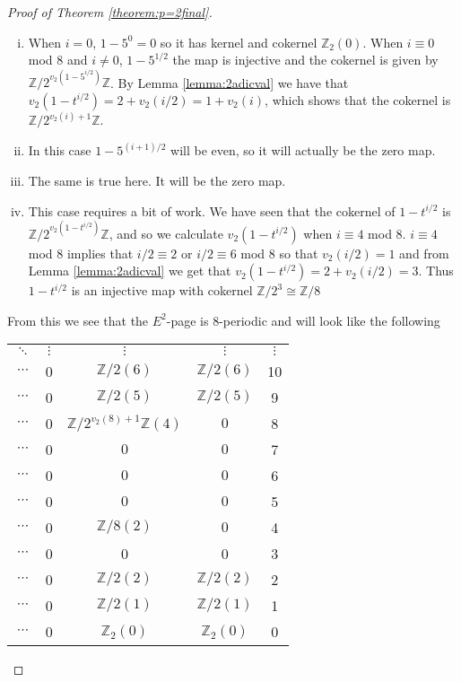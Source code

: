 \documentclass[a4paper]{article} %
\theoremstyle{definition}
\newcommand{\Z}{\mathbb{Z}}
\begin{document}
\begin{proof}[Proof of Theorem \ref{theorem:p=2final}]
  \begin{enumerate}[i)]
    \item When $i=0$, $1-5^0 = 0$ so it has kernel and cokernel $\Z_2(0)$. When $i \equiv 0$ mod $8$ and $i \neq 0$, $1-5^{1/2}$ the map is injective and the cokernel is given by $\Z/2^{v_2(1-5^{i/2})}\Z$. By Lemma \ref{lemma:2adicval} we have that $v_2(1-t^{i/2}) = 2 + v_2(i/2) = 1 + v_2(i)$,
    which shows that the cokernel is $\Z/2^{v_2(i)+1}\Z$.
    \item In this case $1-5^{(i+1)/2}$ will be even, so it will actually be the zero map.
    \item The same is true here. It will be the zero map.
    \item This case requires a bit of work. We have seen that the cokernel of $1-t^{i/2}$ is $\Z/2^{v_2(1-t^{i/2})}\Z$, and so we calculate $v_2({1-t^{i/2}})$ when $i \equiv 4$ mod $8$. $i \equiv 4$ mod $8$ implies that $i/2 \equiv 2$ or $i/2 \equiv 6$ mod $8$ so that $v_2(i/2) = 1$
    and from Lemma \ref{lemma:2adicval} we get that $v_2(1-t^{i/2}) = 2 + v_2(i/2) = 3$. Thus $1-t^{i/2}$ is an injective map with cokernel $\Z/2^3 \cong \Z/8$
  \end{enumerate}
  From this we see that the $E^2$-page is $8$-periodic and will look like the following
  \begin{table}[H]
    \centering
    \setlength{\tabcolsep}{12pt}
    \setlength{\extrarowheight}{2pt}
  \begin{tabular}{cccc|c}
    $\ddots$        &   $\vdots$ &  $\vdots$  & $\vdots$  & $\vdots$ \\
    $\cdots$        &   0 &  $\Z/2(6)$  & $\Z/2(6)$  & 10 \\
    $\cdots$        &   0 &  $\Z/2(5)$  & $\Z/2(5)$  & 9 \\
    $\cdots$        &   0 &  $\Z/2^{v_2(8)+1}\Z(4)$  & $0$  & 8 \\
    $\cdots$        &   0 &  $0$  & $0$  & 7 \\
    $\cdots$        &   0 &  $0$  & $0$  & 6 \\
    $\cdots$        &   0 &  $0$  & $0$  & 5 \\
      $\cdots$        &   0 &  $\Z/8 (2)$  & $0$  & 4 \\
      $\cdots$        &   0 &  0  &  0 & 3 \\
      $\cdots$        &  0  &  $\Z/2(2)$  &  $\Z/2(2)$ & 2 \\
      $\cdots$       &  0  &  $\Z/2(1)$  & $\Z/2(1)$  & 1 \\
      $\cdots$       &  0  & $\Z_2(0)$ &  $\Z_2(0)$  & 0 \\ \hline

\end{tabular}
\end{table}
\end{proof}
\end{document}
